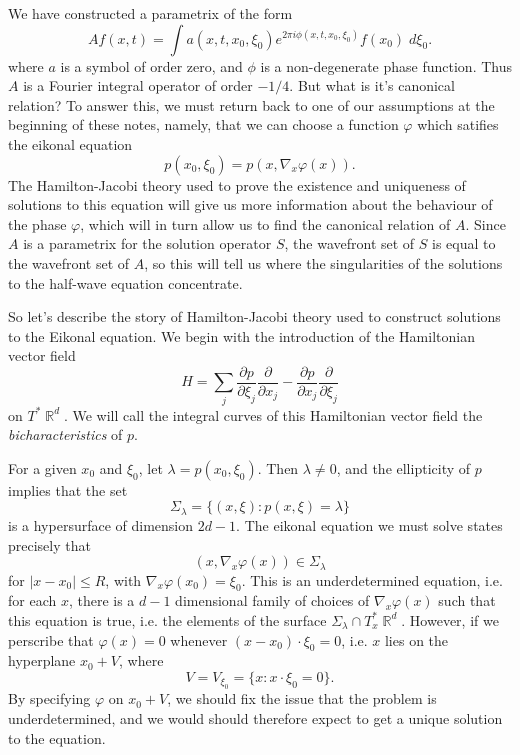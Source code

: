 \documentclass{article}
\theoremstyle{plain}
\theoremstyle{remark}
\theoremstyle{definition}
\DeclareMathOperator{\RR}{\mathbb{R}}
\begin{document}
We have constructed a parametrix of the form
%
\[ Af(x,t) = \int a(x,t,x_0,\xi_0) e^{2 \pi i \phi(x,t,x_0,\xi_0)} f(x_0)\; d\xi_0. \]
%
where $a$ is a symbol of order zero, and $\phi$ is a non-degenerate phase function. Thus $A$ is a Fourier integral operator of order $-1/4$. But what is it's canonical relation? To answer this, we must return back to one of our assumptions at the beginning of these notes, namely, that we can choose a function $\varphi$ which satifies the eikonal equation
%
\[ p(x_0,\xi_0) = p(x, \nabla_x \varphi(x)). \]
%
The Hamilton-Jacobi theory used to prove the existence and uniqueness of solutions to this equation will give us more information about the behaviour of the phase $\varphi$, which will in turn allow us to find the canonical relation of $A$. Since $A$ is a parametrix for the solution operator $S$, the wavefront set of $S$ is equal to the wavefront set of $A$, so this will tell us where the singularities of the solutions to the half-wave equation concentrate.

So let's describe the story of Hamilton-Jacobi theory used to construct solutions to the Eikonal equation. We begin with the introduction of the Hamiltonian vector field
%
\[ H = \sum_j \frac{\partial p}{\partial \xi_j} \frac{\partial}{\partial x_j} - \frac{\partial p}{\partial x_j} \frac{\partial}{\partial \xi_j} \]
%
on $T^* \RR^d$. We will call the integral curves of this Hamiltonian vector field the \emph{bicharacteristics} of $p$.

For a given $x_0$ and $\xi_0$, let $\lambda = p(x_0,\xi_0)$. Then $\lambda \neq 0$, and the ellipticity of $p$ implies that the set
%
\[ \Sigma_\lambda = \{ (x,\xi) : p(x,\xi) = \lambda \} \]
%
is a hypersurface of dimension $2d - 1$. The eikonal equation we must solve states precisely that
%
\[ (x, \nabla_x \varphi(x)) \in \Sigma_\lambda \]
%
for $|x - x_0| \leq R$, with $\nabla_x \varphi(x_0) = \xi_0$. This is an underdetermined equation, i.e. for each $x$, there is a $d-1$ dimensional family of choices of $\nabla_x \varphi(x)$ such that this equation is true, i.e. the elements of the surface $\Sigma_\lambda \cap T^*_x \RR^d$. However, if we perscribe that $\varphi(x) = 0$ whenever $(x - x_0) \cdot \xi_0 = 0$, i.e. $x$ lies on the hyperplane $x_0 + V$, where
%
\[ V = V_{\xi_0} = \{ x: x \cdot \xi_0 = 0 \}. \]
%
By specifying $\varphi$ on $x_0 + V$, we should fix the issue that the problem is underdetermined, and we would should therefore expect to get a unique solution to the equation. 
\end{document}
